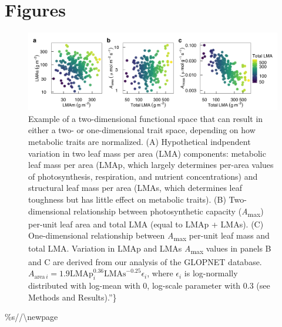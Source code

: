 \documentclass[
  12pt,
]{article}
\begin{document}
\newpage

\hypertarget{figures}{%
\section{Figures}\label{figures}}

\begin{figure}
\hypertarget{fig:Hplt}{%
\centering
\includegraphics{../figs/fig_h3.png}
\caption{Example of a two-dimensional functional space that can result in either a two- or one-dimensional trait space, depending on how metabolic traits are normalized. (A) Hypothetical indpendent variation in two leaf mass per area (LMA) components: metabolic leaf mass per area (LMAp, which largely determines per-area values of photosynthesis, respiration, and nutrient concentrations) and structural leaf mass per area (LMAs, which determines leaf toughness but has little effect on metabolic traits).
(B) Two-dimensional relationship between photosynthetic capacity (\emph{A}\textsubscript{max}) per-unit leaf area and total LMA (equal to LMAp + LMAs).
(C) One-dimensional relationship between \emph{A}\textsubscript{max} per-unit leaf mass and total LMA. Variation in LMAp and LMAs \emph{A}\textsubscript{max} values in panels B and C are derived from our analysis of the GLOPNET database. \(A_{\mathrm{area} \, i}=1.9\mathrm{LMAp}_i^{0.36}\mathrm{LMAs}^{-0.25}\epsilon_i\), where \(\epsilon_i\) is log-normally distributed with log-mean with 0, log-scale parameter with 0.3 (see Methods and Results).''\}}\label{fig:Hplt}
}
\end{figure}

\%s/\newpage/\textbackslash newpage
\end{document}
